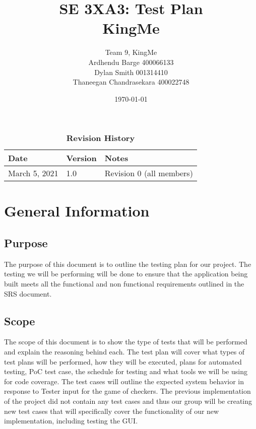 \documentclass[12pt, titlepage]{article}
\title{SE 3XA3: Test Plan\\KingMe}
\author{Team 9, KingMe
		\\ Ardhendu Barge 400066133
		\\ Dylan Smith 001314410
		\\ Thaneegan Chandrasekara 400022748
}
\date{\today}
\begin{document}
\maketitle

\tableofcontents
\listoftables
\listoffigures

\begin{table}[bp]
\caption{\bf Revision History}
\begin{tabularx}{\textwidth}{p{3cm}p{2cm}X}
\toprule {\bf Date} & {\bf Version} & {\bf Notes}\\
\midrule
March 5, 2021 & 1.0 & Revision 0 (all members)\\
\bottomrule
\end{tabularx}
\end{table}

\newpage


\section{General Information}

\subsection{Purpose}
The purpose of this document is to outline the testing plan for our project. The testing we will be performing will be done to ensure that the application being built meets all the functional and non functional requirements outlined in the SRS document. 

\subsection{Scope}
The scope of this document is to show the type of tests that will be performed and explain the reasoning behind each. The test plan will cover what types of test plans will be performed, how they will be executed, plans for automated testing, PoC test case, the schedule for testing and what tools we will be using for code coverage. The test cases will outline the expected system behavior in response to Tester input for the game of checkers. The previous implementation of the project did not contain any test cases and thus our group will be creating new test cases that will specifically cover the functionality of our new implementation, including testing the GUI.
\end{document}
